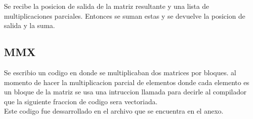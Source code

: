         Se recibe la posicion de salida de la matriz resultante y una lista de
        multiplicaciones parciales. Entonces se suman estas y se devuelve la
        posicion de salida y la suma.

\subsection{MMX}
    Se escribio un codigo en  donde se multiplicaban dos matrices
    por bloques. al momento de hacer la multiplicacion parcial de elementos donde
    cada elemento es un bloque de la matriz se usa una intruccion llamada
     para decirle al  compilador que la siguiente
    fraccion de codigo sera vectoriada.\\
    Este codigo fue dessarrollado en el archivo  que
    se encuentra en el anexo.


